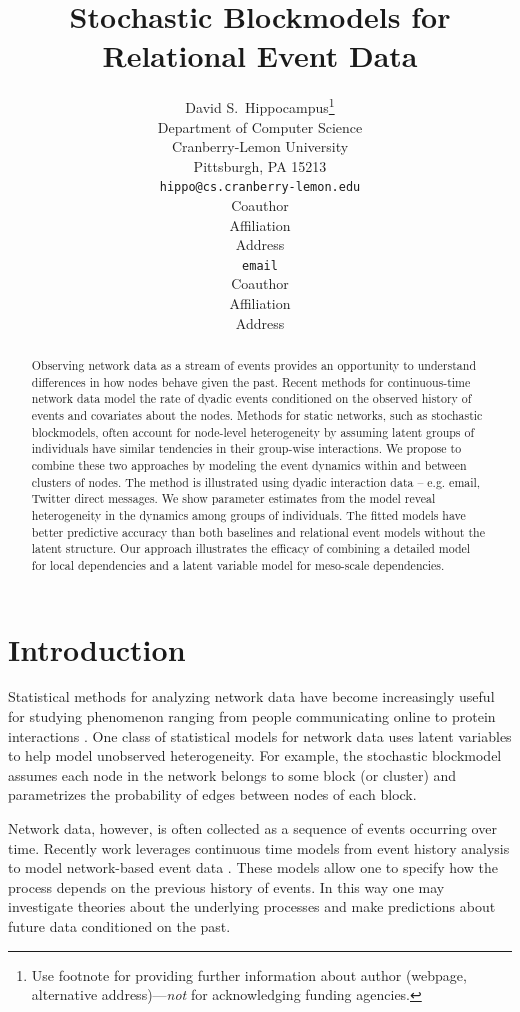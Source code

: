 \documentclass{article}
\title{Stochastic Blockmodels for Relational Event Data}
\author{
David S.~Hippocampus\thanks{ Use footnote for providing further information
about author (webpage, alternative address)---\emph{not} for acknowledging
funding agencies.} \\
Department of Computer Science\\
Cranberry-Lemon University\\
Pittsburgh, PA 15213 \\
\texttt{hippo@cs.cranberry-lemon.edu} \\
\And
Coauthor \\
Affiliation \\
Address \\
\texttt{email} \\
\AND
Coauthor \\
Affiliation \\
Address \\
}
\begin{document}
 

\maketitle

\begin{abstract}
Observing network data as a stream of events provides an opportunity to understand differences in how nodes behave given the past.  Recent methods for continuous-time network data model the rate of dyadic events conditioned on the observed history of events and covariates about the nodes.  Methods for static networks, such as stochastic blockmodels, often account for node-level heterogeneity by assuming latent groups of individuals have similar tendencies in their group-wise interactions.  We propose to combine these two approaches by modeling the event dynamics within and between clusters of nodes.  The method is illustrated using dyadic interaction data -- e.g. email, Twitter direct messages.  We show parameter estimates from the model reveal heterogeneity in the dynamics among groups of individuals.  The fitted models have better predictive accuracy than both baselines and relational event models without the latent structure.  Our approach illustrates the efficacy of combining a detailed model for local dependencies and a latent variable model for meso-scale dependencies.
\end{abstract}

\section{Introduction}

Statistical methods for analyzing network data have become increasingly useful for studying  phenomenon ranging from people communicating online to protein interactions \cite{Goldenberg2009}.  One class of statistical models for network data uses latent variables to help model unobserved heterogeneity.  For example, the stochastic blockmodel \cite{Nowicki2001, Kemp} assumes each node in the network belongs to some block (or cluster) and parametrizes the probability of edges between nodes of each block.  %

Network data, however, is often collected as a sequence of events occurring over time.   Recently work leverages  continuous time models from event history analysis  \cite{AalenOddO.2008} to model network-based event data \cite{Butts2008,Brandes2009,Perry2011,Stadtfeld2010,Stadtfeld2011,Opsahl2011,Vu2011,Vu2011a}.  These models allow one to specify how the process depends on the previous history of events.  In this way one may investigate theories about the underlying processes and make predictions about future data conditioned on the past.
\end{document}
